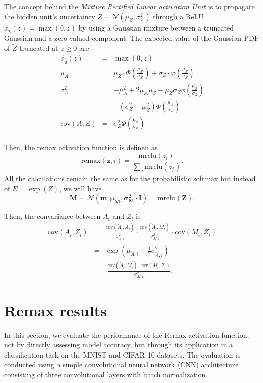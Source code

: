 \documentclass{article}
\begin{document}
The concept behind the \emph{Mixture Rectified Linear activation Unit} is to propagate the hidden unit's uncertainty $Z\sim\mathcal{N}(\mu_Z,\sigma_Z^2)$ through a ReLU $\phi_\mathtt{R}(z)=\max(0,z)$ by using a Gaussian mixture between a truncated Gaussian and a zero-valued component. The expected value of the Gaussian PDF of $\tilde{Z}$ truncated at $z\geq0$ are
\begin{equation}
 \begin{array}{rclll}
 \phi_\mathtt{R}(z)&=&\max(0,z)\\[2pt]

\mu_A &=&\mu_Z\cdot\Phi\left(\frac{\mu_Z}{\sigma_Z}\right)+\sigma_Z \cdot \varphi\left(\frac{\mu_Z}{\sigma_Z}\right)\\[6pt]
\sigma_A^2 &=&   -\mu_A^2 + 2\mu_A\mu_Z  - \mu_Z\sigma_Z \phi\left(\frac{{\mu_Z}}{{\sigma_Z}}\right) \\
 && + \left(\sigma_Z^2-\mu_Z^2\right)\Phi\left(\frac{{\mu_Z }}{{\sigma_Z}}\right)\\[6pt]
  \text{cov}(A,Z)&=& \sigma_Z^2\Phi\left(\frac{\mu_Z}{\sigma_Z}\right) \\[6pt] 
\end{array}
\end{equation}

Then, the remax activation function is defined as
\begin{equation}
\text{remax}(\bm{z},i)=\frac{\text{mrelu}(z_i)}{\sum_j \text{mrelu}(z_j)}.
\end{equation}
All the calculations remain the same as for the probabilistic softmax but instead of $E = \exp(Z)$, we will have $$\bm{M}\sim\mathcal{N}(\bm{m};\bm{\mu}_{\bm{M}},\bm{\sigma}_{\bm{M}}^2\cdot \mathbf{I})=\text{mrelu}(\bm{Z}).$$

Then, the convariance between $A_i$ and $Z_i$ is 
\begin{equation}
\begin{array}{rcl}
\text{cov}(A_i,Z_i)&=&\frac{\text{cov}(\check{A}_i,A_i)}{\sigma_{\check{A},i}^2}\cdot \frac{\text{cov}(\check{A}_i,M_i)}{\sigma^{2}_{M, i}}\cdot\text{cov}(M_i,Z_i)\\[4pt]
&=&\exp(\mu_{\check{A},i}+\tfrac{1}{2}\sigma_{\check{A},i}^2) \\
&& \cdot\frac{\text{cov}(\check{A}_i,M_i) \cdot\text{cov}(M_i,Z_i)}{\sigma^{2}_{M, i}}.\end{array}
\end{equation}

 \section{Remax results}
In this section, we evaluate the performance of the Remax activation function, not by directly assessing model accuracy, but through its application in a classification task on the MNIST and CIFAR-10 datasets. The evaluation is conducted using a simple convolutional neural network (CNN) architecture consisting of three convolutional layers with batch normalization.
\end{document}
